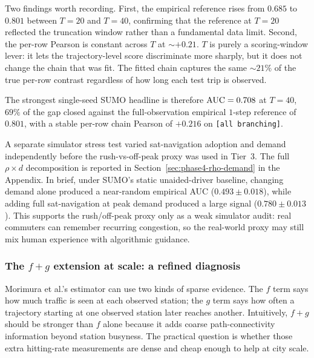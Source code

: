 Two findings worth recording. First, the empirical reference rises from
$0.685$ to $0.801$ between $T=20$ and $T=40$, confirming that
the reference at $T=20$ reflected the truncation window rather than a
fundamental data limit. Second, the per-row Pearson is constant across
$T$ at $\sim +0.21$. $T$ is purely a scoring-window lever: it lets the
trajectory-level score discriminate more sharply, but it does not
change the chain that was fit. The fitted chain captures the same
$\sim 21\%$ of the true per-row contrast regardless of how long each test
trip is observed.

The strongest single-seed SUMO headline is therefore $\mathrm{AUC} = 0.708$
at $T=40$, $69\%$ of the gap closed against the full-observation
empirical $1$-step reference of $0.801$, with a stable per-row chain
Pearson of $+0.216$ on \texttt{[all branching]}.

A separate simulator stress test varied sat-navigation adoption and demand
independently before the rush-vs-off-peak proxy was used in Tier~3. The
full $\rho \times d$ decomposition is reported in
Section~\ref{sec:phase4-rho-demand} in the Appendix. In brief, under
SUMO's static unaided-driver baseline, changing demand alone produced a
near-random empirical AUC ($0.493 \pm 0.018$), while adding full
sat-navigation at peak demand produced a large signal
($0.780 \pm 0.013$). This supports the rush/off-peak proxy only as a weak
simulator audit: real commuters can remember recurring congestion, so the
real-world proxy may still mix human experience with algorithmic guidance.

\subsubsection{The \texorpdfstring{$f+g$}{f+g} extension at scale: a refined diagnosis}
\label{sec:phase4-fg-infeasible}

Morimura et al.'s estimator can use two kinds of sparse evidence. The
$f$ term says how much traffic is seen at each observed station; the $g$
term says how often a trajectory starting at one observed station later
reaches another. Intuitively, $f+g$ should be stronger than $f$ alone
because it adds coarse path-connectivity information beyond station
busyness. The practical question is whether those extra hitting-rate
measurements are dense and cheap enough to help at city scale.

